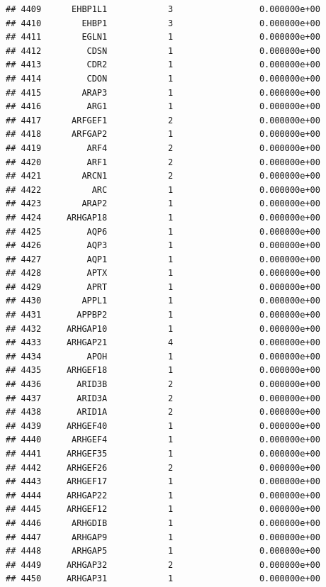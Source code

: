 \documentclass[
]{article}
\begin{document}
\begin{verbatim}
## 4409      EHBP1L1            3                 0.000000e+00
## 4410        EHBP1            3                 0.000000e+00
## 4411        EGLN1            1                 0.000000e+00
## 4412         CDSN            1                 0.000000e+00
## 4413         CDR2            1                 0.000000e+00
## 4414         CDON            1                 0.000000e+00
## 4415        ARAP3            1                 0.000000e+00
## 4416         ARG1            1                 0.000000e+00
## 4417      ARFGEF1            2                 0.000000e+00
## 4418      ARFGAP2            1                 0.000000e+00
## 4419         ARF4            2                 0.000000e+00
## 4420         ARF1            2                 0.000000e+00
## 4421        ARCN1            2                 0.000000e+00
## 4422          ARC            1                 0.000000e+00
## 4423        ARAP2            1                 0.000000e+00
## 4424     ARHGAP18            1                 0.000000e+00
## 4425         AQP6            1                 0.000000e+00
## 4426         AQP3            1                 0.000000e+00
## 4427         AQP1            1                 0.000000e+00
## 4428         APTX            1                 0.000000e+00
## 4429         APRT            1                 0.000000e+00
## 4430        APPL1            1                 0.000000e+00
## 4431       APPBP2            1                 0.000000e+00
## 4432     ARHGAP10            1                 0.000000e+00
## 4433     ARHGAP21            4                 0.000000e+00
## 4434         APOH            1                 0.000000e+00
## 4435     ARHGEF18            1                 0.000000e+00
## 4436       ARID3B            2                 0.000000e+00
## 4437       ARID3A            2                 0.000000e+00
## 4438       ARID1A            2                 0.000000e+00
## 4439     ARHGEF40            1                 0.000000e+00
## 4440      ARHGEF4            1                 0.000000e+00
## 4441     ARHGEF35            1                 0.000000e+00
## 4442     ARHGEF26            2                 0.000000e+00
## 4443     ARHGEF17            1                 0.000000e+00
## 4444     ARHGAP22            1                 0.000000e+00
## 4445     ARHGEF12            1                 0.000000e+00
## 4446      ARHGDIB            1                 0.000000e+00
## 4447      ARHGAP9            1                 0.000000e+00
## 4448      ARHGAP5            1                 0.000000e+00
## 4449     ARHGAP32            2                 0.000000e+00
## 4450     ARHGAP31            1                 0.000000e+00

\end{verbatim}
\end{document}
